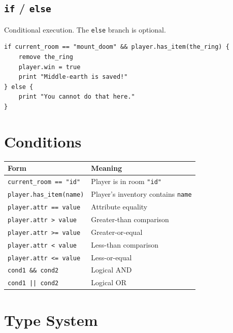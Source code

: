 \documentclass[12pt, a4paper]{article}
\begin{document}
\subsection{\texttt{if} / \texttt{else}}
Conditional execution. The \texttt{else} branch is optional.

\begin{lstlisting}[style=dc, caption={Conditional statement}]
if current_room == "mount_doom" && player.has_item(the_ring) {
    remove the_ring
    player.win = true
    print "Middle-earth is saved!"
} else {
    print "You cannot do that here."
}
\end{lstlisting}

\section{Conditions}

\begin{center}
\begin{tabular}{p{5.5cm} p{7cm}}
\toprule
\textbf{Form} & \textbf{Meaning} \\
\midrule
\texttt{current\_room == "id"} & Player is in room \texttt{"id"} \\
\texttt{player.has\_item(name)} & Player's inventory contains \texttt{name} \\
\texttt{player.attr == value} & Attribute equality \\
\texttt{player.attr > value} & Greater-than comparison \\
\texttt{player.attr >= value} & Greater-or-equal \\
\texttt{player.attr < value} & Less-than comparison \\
\texttt{player.attr <= value} & Less-or-equal \\
\texttt{cond1 \&\& cond2} & Logical AND \\
\texttt{cond1 || cond2} & Logical OR \\
\bottomrule
\end{tabular}
\end{center}

\section{Type System}
\end{document}
